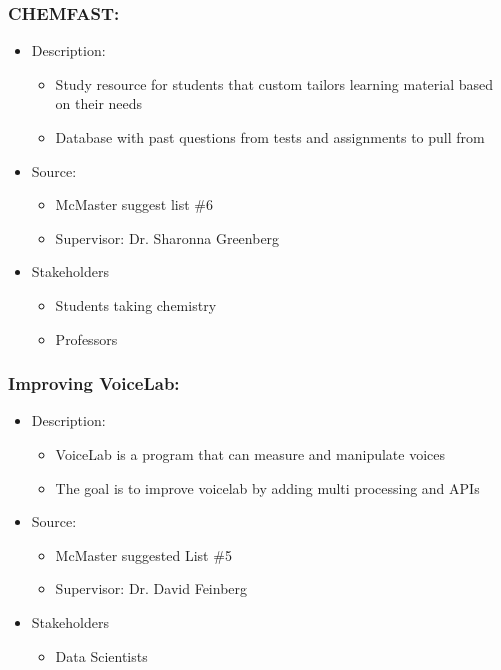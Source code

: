 \documentclass{article}
\begin{document}
\subsubsection*{CHEMFAST:}
\label{subsec:chemfast}
\begin{itemize}
    \item Description:
    \begin{itemize}
        \item Study resource for students that custom tailors learning material based on their needs
        \item Database with past questions from tests and assignments to pull from
    \end{itemize}
    \item Source:
    \begin{itemize}
        \item McMaster suggest list \#6
        \item Supervisor: Dr. Sharonna Greenberg
    \end{itemize}
    \item Stakeholders
    \begin{itemize}
        \item Students taking chemistry
        \item Professors
    \end{itemize}
\end{itemize}

\subsubsection*{Improving VoiceLab:}
\label{subsec:voicelab}
\begin{itemize}
    \item Description:
    \begin{itemize}
        \item VoiceLab is a program that can measure and manipulate voices 
        \item The goal is to improve voicelab by adding multi processing and APIs
    \end{itemize}
    \item Source:
    \begin{itemize}
        \item McMaster suggested List \#5
        \item Supervisor: Dr. David Feinberg
    \end{itemize}
    \item Stakeholders
    \begin{itemize}
        \item Data Scientists
    \end{itemize}
\end{itemize}
\end{document}
